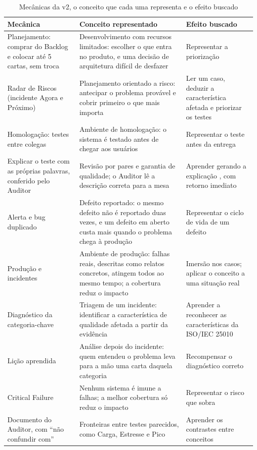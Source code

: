 \begin{table}[ht]
  \centering
  \caption{Mecânicas da v2, o conceito que cada uma representa e o efeito buscado}
  \label{tab:mecanicas}
  \footnotesize
  \begin{tabularx}{\linewidth}{>{\raggedright\arraybackslash}p{2.9cm} >{\raggedright\arraybackslash}X >{\raggedright\arraybackslash}p{4.0cm}}
    \toprule
    Mecânica & Conceito representado & Efeito buscado \\
    \midrule
    Planejamento: comprar do Backlog e colocar até 5 cartas, sem troca & Desenvolvimento com recursos limitados: escolher o que entra no produto, e uma decisão de arquitetura difícil de desfazer & Representar a priorização \\
    Radar de Riscos (incidente Agora e Próximo) & Planejamento orientado a risco: antecipar o problema provável e cobrir primeiro o que mais importa & Ler um caso, deduzir a característica afetada e priorizar os testes \\
    Homologação: testes entre colegas & Ambiente de homologação: o sistema é testado antes de chegar aos usuários \cite{humble2010} & Representar o teste antes da entrega \\
    Explicar o teste com as próprias palavras, conferido pelo Auditor & Revisão por pares e garantia de qualidade; o Auditor lê a descrição correta para a mesa & Aprender gerando a explicação \cite{slamecka1978} \cite{bertsch2007}, com retorno imediato \\
    Alerta e bug duplicado & Defeito reportado: o mesmo defeito não é reportado duas vezes, e um defeito em aberto custa mais quando o problema chega à produção & Representar o ciclo de vida de um defeito \\
    Produção e incidentes & Ambiente de produção: falhas reais, descritas como relatos concretos, atingem todos ao mesmo tempo; a cobertura reduz o impacto & Imersão nos casos; aplicar o conceito a uma situação real \\
    Diagnóstico da categoria-chave & Triagem de um incidente: identificar a característica de qualidade afetada a partir da evidência & Aprender a reconhecer as características da ISO/IEC 25010 \\
    Lição aprendida & Análise depois do incidente: quem entendeu o problema leva para a mão uma carta daquela categoria & Recompensar o diagnóstico correto \\
    Critical Failure & Nenhum sistema é imune a falhas; a melhor cobertura só reduz o impacto & Representar o risco que sobra \\
    Documento do Auditor, com ``não confundir com'' & Fronteiras entre testes parecidos, como Carga, Estresse e Pico & Aprender os contrastes entre conceitos \\
    \bottomrule
  \end{tabularx}
\end{table}

